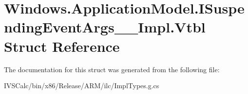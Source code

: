 \hypertarget{struct_windows_1_1_application_model_1_1_i_suspending_event_args_____impl_1_1_vtbl}{}\section{Windows.\+Application\+Model.\+I\+Suspending\+Event\+Args\+\_\+\+\_\+\+Impl.\+Vtbl Struct Reference}
\label{struct_windows_1_1_application_model_1_1_i_suspending_event_args_____impl_1_1_vtbl}


The documentation for this struct was generated from the following file\+:\begin{DoxyCompactItemize}
\item 
I\+V\+S\+Calc/bin/x86/\+Release/\+A\+R\+M/ilc/Impl\+Types.\+g.\+cs\end{DoxyCompactItemize}

